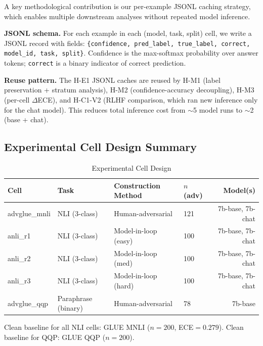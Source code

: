 A key methodological contribution is our per-example JSONL caching strategy, which enables multiple downstream analyses without repeated model inference.

\textbf{JSONL schema.} For each example in each (model, task, split) cell, we write a JSONL record with fields: \texttt{\{confidence, pred\_label, true\_label, correct, model\_id, task, split\}}. Confidence is the max-softmax probability over answer tokens; \texttt{correct} is a binary indicator of correct prediction.

\textbf{Reuse pattern.} The H-E1 JSONL caches are reused by H-M1 (label preservation + stratum analysis), H-M2 (confidence-accuracy decoupling), H-M3 (per-cell $\Delta$ECE), and H-C1-V2 (RLHF comparison, which ran new inference only for the chat model). This reduces total inference cost from $\sim$5 model runs to $\sim$2 (base + chat).

\subsection{Experimental Cell Design Summary}

\begin{table}[h]
\centering
\caption{Experimental Cell Design}
\label{tab:cells}
\begin{tabular}{llllr}
\toprule
Cell & Task & Construction Method & $n$ (adv) & Model(s) \\
\midrule
advglue\_mnli & NLI (3-class) & Human-adversarial & 121 & 7b-base, 7b-chat \\
anli\_r1 & NLI (3-class) & Model-in-loop (easy) & 100 & 7b-base, 7b-chat \\
anli\_r2 & NLI (3-class) & Model-in-loop (med) & 100 & 7b-base, 7b-chat \\
anli\_r3 & NLI (3-class) & Model-in-loop (hard) & 100 & 7b-base, 7b-chat \\
advglue\_qqp & Paraphrase (binary) & Human-adversarial & 78 & 7b-base \\
\bottomrule
\end{tabular}
\end{table}

Clean baseline for all NLI cells: GLUE MNLI ($n=200$, ECE$=0.279$). Clean baseline for QQP: GLUE QQP ($n=200$).
